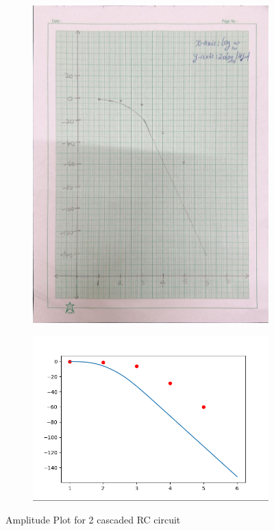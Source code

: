 \documentclass{article}
\begin{document}
\begin{figure}[H]
    \centering
    \begin{subfigure}[b]{0.45\textwidth}
        \centering
        \includegraphics[width=\textwidth]{figs/ampl2.png}
    \end{subfigure}
    \hfill
    \begin{subfigure}[b]{0.45\textwidth}
        \centering
        \includegraphics[width=1.7\textwidth]{figs/ampl_2cas.png}
    \end{subfigure}
    
    \caption{Amplitude Plot for 2 cascaded RC circuit}
\end{figure}
\end{document}
